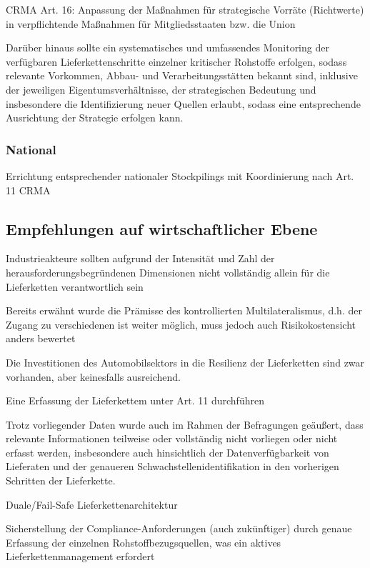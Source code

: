 \documentclass[12pt,a4paper,oneside]{book} %
\begin{document}
CRMA
Art. 16: Anpassung der Maßnahmen für strategische Vorräte (Richtwerte) in verpflichtende Maßnahmen für Mitgliedsstaaten bzw. die Union

Darüber hinaus sollte ein systematisches und umfassendes Monitoring der verfügbaren Lieferkettenschritte einzelner kritischer Rohstoffe erfolgen, sodass relevante Vorkommen, Abbau- und Verarbeitungsstätten bekannt sind, inklusive der jeweiligen Eigentumsverhältnisse, der strategischen Bedeutung und insbesondere die Identifizierung neuer Quellen erlaubt, sodass eine entsprechende Ausrichtung der Strategie erfolgen kann.

\subsubsection{National}


Errichtung entsprechender nationaler Stockpilings mit Koordinierung nach Art. 11 CRMA

\subsection{Empfehlungen auf wirtschaftlicher Ebene}

Industrieakteure sollten aufgrund der Intensität und Zahl der herausforderungsbegründenen Dimensionen nicht vollständig allein für die Lieferketten verantwortlich sein

Bereits erwähnt wurde die Prämisse des kontrollierten Multilateralismus, d.h. der Zugang zu verschiedenen ist weiter möglich, muss jedoch auch Risikokostensicht anders bewertet

Die Investitionen des Automobilsektors in die Resilienz der Lieferketten sind zwar vorhanden, aber keinesfalls ausreichend.

Eine Erfassung der Lieferkettem unter Art. 11 durchführen

Trotz vorliegender Daten wurde auch im Rahmen der Befragungen geäußert, dass relevante Informationen teilweise oder vollständig nicht vorliegen oder nicht erfasst werden, insbesondere auch hinsichtlich der Datenverfügbarkeit von Lieferaten und der genaueren Schwachstellenidentifikation in den vorherigen Schritten der Lieferkette.

Duale/Fail-Safe Lieferkettenarchitektur

Sicherstellung der Compliance-Anforderungen (auch zukünftiger) durch genaue Erfassung der einzelnen Rohstoffbezugsquellen, was ein aktives Lieferkettenmanagement erfordert
\end{document}
